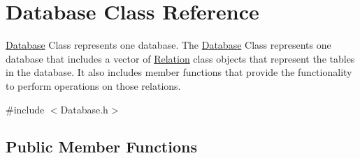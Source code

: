 \hypertarget{class_database}{\section{Database Class Reference}
\label{class_database}
}


\hyperlink{class_database}{Database} Class represents one database. The \hyperlink{class_database}{Database} Class represents one database that includes a vector of \hyperlink{class_relation}{Relation} class objects that represent the tables in the database. It also includes member functions that provide the functionality to perform operations on those relations.  




{\ttfamily \#include $<$Database.\-h$>$}

\subsection*{Public Member Functions}
